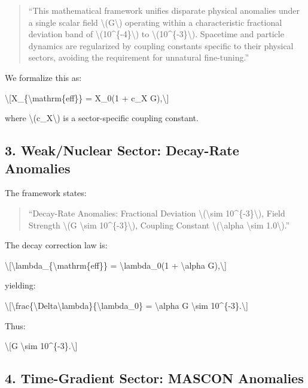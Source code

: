 \documentclass[
  10pt,
]{article}
\begin{document}
\begin{quote}
``This mathematical framework unifies disparate physical anomalies under
a single scalar field \textbackslash(G\textbackslash) operating within a
characteristic fractional deviation band of
\textbackslash(10\^{}\{-4\}\textbackslash) to
\textbackslash(10\^{}\{-3\}\textbackslash). Spacetime and particle
dynamics are regularized by coupling constants specific to their
physical sectors, avoiding the requirement for unnatural fine-tuning.''
\end{quote}

We formalize this as:

\textbackslash{[}X\_\{\textbackslash mathrm\{eff\}\} = X\_0(1 + c\_X
G),\textbackslash{]}

where \textbackslash(c\_X\textbackslash) is a sector-specific coupling
constant.

\hypertarget{weaknuclear-sector-decay-rate-anomalies}{%
\subsection{3. Weak/Nuclear Sector: Decay-Rate
Anomalies}\label{weaknuclear-sector-decay-rate-anomalies}}

The framework states:

\begin{quote}
``Decay-Rate Anomalies: Fractional Deviation
\textbackslash(\textbackslash sim 10\^{}\{-3\}\textbackslash), Field
Strength \textbackslash(G \textbackslash sim
10\^{}\{-3\}\textbackslash), Coupling Constant
\textbackslash(\textbackslash alpha \textbackslash sim
1.0\textbackslash).''
\end{quote}

The decay correction law is:

\textbackslash{[}\textbackslash lambda\_\{\textbackslash mathrm\{eff\}\}
= \textbackslash lambda\_0(1 + \textbackslash alpha G),\textbackslash{]}

yielding:

\textbackslash{[}\textbackslash frac\{\textbackslash Delta\textbackslash lambda\}\{\textbackslash lambda\_0\}
= \textbackslash alpha G \textbackslash sim
10\^{}\{-3\}.\textbackslash{]}

Thus:

\textbackslash{[}G \textbackslash sim 10\^{}\{-3\}.\textbackslash{]}

\hypertarget{time-gradient-sector-mascon-anomalies}{%
\subsection{4. Time-Gradient Sector: MASCON
Anomalies}\label{time-gradient-sector-mascon-anomalies}}
\end{document}

